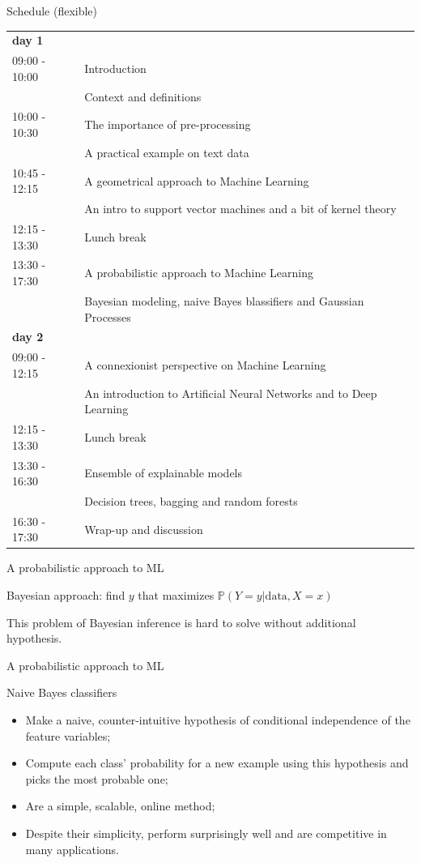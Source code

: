 \documentclass[10pt,a4paper,t,aspectratio=1610,dvipsnames]{beamer}
\begin{document}
\begin{frame}{Schedule (flexible)}
\begin{tabular}{ll}
	\textbf{day 1} & \\
	09:00 - 10:00 & Introduction\\
	& {\footnotesize Context and definitions}\\
	10:00 - 10:30 & The importance of pre-processing\\
	& {\footnotesize A practical example on text data}\\
	10:45 - 12:15 & A geometrical approach to Machine Learning\\
	& {\footnotesize An intro to support vector machines and a bit of kernel theory}\\
	12:15 - 13:30 & Lunch break\\
	13:30 - 17:30 & A probabilistic approach to Machine Learning\\
	& {\footnotesize Bayesian modeling, naive Bayes blassifiers and Gaussian Processes}\\
	\hline
	\textbf{day 2}&\\
	09:00 - 12:15 & A connexionist perspective on Machine Learning\\
	& {\footnotesize An introduction to Artificial Neural Networks and to Deep Learning}\\
	12:15 - 13:30 & Lunch break\\
	13:30 - 16:30 & Ensemble of explainable models\\
	& {\footnotesize Decision trees, bagging and random forests}\\
	16:30 - 17:30 & Wrap-up and discussion
\end{tabular}
\end{frame}

\begin{frame}{A probabilistic approach to ML}
	\begin{block}{}
		Bayesian approach: find $y$ that maximizes $\mathbb{P}(Y=y|\textrm{data}, X=x)$
	\end{block}
	This problem of Bayesian inference is hard to solve without additional hypothesis.
\end{frame}

\begin{frame}{A probabilistic approach to ML}
	\begin{block}{Naive Bayes classifiers}
		\begin{itemize}
			\item Make a naive, counter-intuitive hypothesis of conditional independence of the feature variables;
			\item Compute each class' probability for a new example using this hypothesis and picks the most probable one;
			\item Are a simple, scalable, online method;
			\item Despite their simplicity, perform surprisingly well and are competitive in many applications.
		\end{itemize}
	\end{block}
	
\end{frame}
\end{document}
